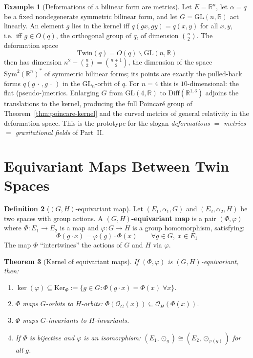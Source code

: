 \documentclass[12pt]{article}
\theoremstyle{plain}
\newtheorem{theorem}{Theorem}[section]
\theoremstyle{definition}
\newtheorem{definition}[theorem]{Definition}
\newtheorem{example}[theorem]{Example}
\theoremstyle{remark}
\newcommand{\Ker}{\mathrm{Ker}}
\newcommand{\Twin}{\mathrm{Twin}}
\newcommand{\Diff}{\mathrm{Diff}}
\newcommand{\GL}{\mathrm{GL}}
\newcommand{\RR}{\mathbb{R}}
\begin{document}
\begin{example}[Deformations of a bilinear form are metrics]\label{ex:metrics}
Let $E=\RR^n$, let $\alpha=q$ be a fixed nondegenerate symmetric bilinear form, and let $G=\GL(n,\RR)$ act
linearly. An element $g$ lies in the kernel iff $q(gx,gy)=q(x,y)$ for all $x,y$, i.e.\ iff $g\in O(q)$, the
orthogonal group of $q$, of dimension $\binom n2$. The deformation space
\[
\Twin(q)=O(q)\backslash\GL(n,\RR)
\]
then has dimension $n^2-\binom n2=\binom{n+1}2$, the dimension of the space $\mathrm{Sym}^2(\RR^{n})^{*}$ of
symmetric bilinear forms; its points are exactly the pulled-back forms $q(g\,\cdot\,,g\,\cdot\,)$ in the
$\GL_n$-orbit of $q$. For $n=4$ this is $10$-dimensional: the flat (pseudo-)metrics. Enlarging $G$ from
$\GL(4,\RR)$ to $\Diff(\RR^{1,3})$ adjoins the translations to the kernel, producing the full Poincar\'e group
of Theorem~\ref{thm:poincare-kernel} and the curved metrics of general relativity in the deformation space.
This is the prototype for the slogan \emph{deformations $=$ metrics $=$ gravitational fields} of Part~II.
\end{example}


\section{Equivariant Maps Between Twin Spaces}
\label{sec:equivariant}

\begin{definition}[$(G,H)$-equivariant map]\label{def:equivariant}
Let $(E_1, \alpha_1, G)$ and $(E_2, \alpha_2, H)$ be two spaces with group actions. A \textbf{$(G,H)$-equivariant map} is a pair $(\Phi, \varphi)$ where $\Phi: E_1 \to E_2$ is a map and $\varphi: G \to H$ is a group homomorphism, satisfying:
\begin{equation}\label{eq:equivariant}
\boxed{\Phi(g \cdot x) = \varphi(g) \cdot \Phi(x) \qquad \forall g \in G,\; x \in E_1}
\end{equation}
The map $\Phi$ ``intertwines'' the actions of $G$ and $H$ via $\varphi$.
\end{definition}

\begin{theorem}[Kernel of equivariant maps]\label{thm:kernel-equivariant}
If $(\Phi, \varphi)$ is $(G,H)$-equivariant, then:
\begin{enumerate}[label=(\alph*)]
    \item $\ker(\varphi) \subseteq \Ker_\Phi := \{g \in G : \Phi(g \cdot x) = \Phi(x)\;\forall x\}$.
    \item $\Phi$ maps $G$-orbits to $H$-orbits: $\Phi(\mathcal{O}_G(x)) \subseteq \mathcal{O}_H(\Phi(x))$.
    \item $\Phi$ maps $G$-invariants to $H$-invariants.
    \item If $\Phi$ is bijective and $\varphi$ is an isomorphism: $(E_1, \odot_g) \cong (E_2, \odot_{\varphi(g)})$ for all $g$.
\end{enumerate}
\end{theorem}
\end{document}
